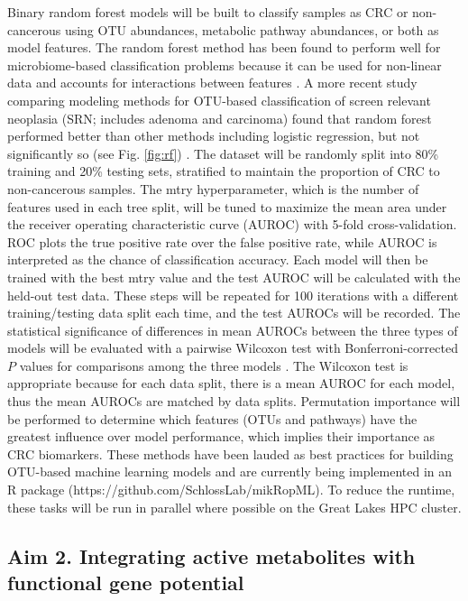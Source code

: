 \documentclass[11pt]{article}
\begin{document}
Binary random forest models will be built to classify samples as CRC or non-cancerous using OTU abundances, metabolic pathway abundances, or both as model features.
The random forest method has been found to perform well for microbiome-based classification problems because it can be used for non-linear data and accounts for interactions between features \cite{baxter_microbiota-based_2016}.
A more recent study comparing modeling methods for OTU-based classification of screen relevant neoplasia (SRN; includes adenoma and carcinoma) found that random forest performed better than other methods including logistic regression, but not significantly so (see Fig. \ref{fig:rf}) \cite{topcuoglu_framework_2020}.
The dataset will be randomly split into 80\% training and 20\% testing sets, stratified to maintain the proportion of CRC to non-cancerous samples.
The mtry hyperparameter, which is the number of features used in each tree split, will be tuned to maximize the mean area under the receiver operating characteristic curve (AUROC) with 5-fold cross-validation.
ROC plots the true positive rate over the false positive rate, while AUROC is interpreted as the chance of classification accuracy.
Each model will then be trained with the best mtry value and the test AUROC will be calculated with the held-out test data.
These steps will be repeated for 100 iterations with a different training/testing data split each time, and the test AUROCs will be recorded.
The statistical significance of differences in mean AUROCs between the three types of models will be evaluated with a pairwise Wilcoxon test with Bonferroni-corrected $P$ values for comparisons among the three models \cite{hannigan_diagnostic_2018}.
The Wilcoxon test is appropriate because for each data split, there is a mean AUROC for each model, thus the mean AUROCs are matched by data splits.
Permutation importance will be performed to determine which features (OTUs and pathways) have the greatest influence over model performance, which implies their importance as CRC biomarkers.
These methods have been lauded as best practices for building OTU-based machine learning models \cite{topcuoglu_framework_2020} and are currently being implemented in an R package (https://github.com/SchlossLab/mikRopML).
To reduce the runtime, these tasks will be run in parallel where possible on the Great Lakes HPC cluster.


\subsection*{Aim 2. Integrating active metabolites with functional gene potential}
\end{document}
